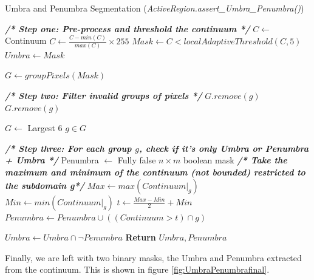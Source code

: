 \begin{algorithm}
\caption{Umbra and Penumbra Segmentation (\textit{ActiveRegion.assert\_Umbra\_Penumbra()}) }\label{alg:umpum}

\begin{algorithmic}[1]
    \State
    \State \textbf{\textit{/* Step one: Pre-process and threshold the continuum */}}
    \State $C \gets$ Continuum
    \State $C \gets \frac{C - min(C)}{max(C)} \times 255$ 
    \State $Mask \gets C < localAdaptiveThreshold(C, 5)$  
    \State $Umbra \gets Mask$ 
    
    \State
    \State $G \gets groupPixels(Mask)$ 
    
    \State 
    \State \textbf{\textit{/* Step two: Filter invalid groups of pixels */}}
            \State $G.remove(g)$
        \EndIf
            \State $G.remove(g)$
        \EndIf
    \EndFor
   
    \State $G \gets $ Largest 6 $g \in G$ 
    
    \State
    \State \textbf{\textit{/* Step three: For each group $g$, check if it's only Umbra or Penumbra + Umbra */}}
    \State Penumbra $\gets$ Fully false $n \times m$ boolean mask
    \State 
        \State
        \State \textbf{\textit{/* Take the maximum and minimum of the continuum (not bounded) restricted to the subdomain g*/}}
        \State $Max \gets max(Continuum|_g)$ 
        \State $Min \gets min(Continuum|_g)$
        \State 
         
            \State $t \gets \frac{Max - Min}{2} + Min$
            \State $Penumbra \gets Penumbra \cup ((Continuum > t) \cap g)$
        \EndIf
    \EndFor
    
    \State
    \State $Umbra \gets Umbra \cap \neg Penumbra$
    \State \textbf{Return} $Umbra, Penumbra$ 
\end{algorithmic}
\end{algorithm}


Finally, we are left with two binary masks, the Umbra and Penumbra extracted from the continuum. This is shown in figure \ref{fig:UmbraPenumbrafinal}.


